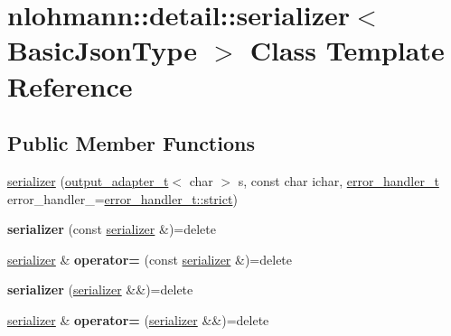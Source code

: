 \hypertarget{classnlohmann_1_1detail_1_1serializer}{}\section{nlohmann\+:\+:detail\+:\+:serializer$<$ Basic\+Json\+Type $>$ Class Template Reference}
\label{classnlohmann_1_1detail_1_1serializer}
\subsection*{Public Member Functions}
\begin{DoxyCompactItemize}
\item 
\hyperlink{classnlohmann_1_1detail_1_1serializer_ac010525281d97867ee842da37294fe83}{serializer} (\hyperlink{namespacenlohmann_1_1detail_a9b680ddfb58f27eb53a67229447fc556}{output\+\_\+adapter\+\_\+t}$<$ char $>$ s, const char ichar, \hyperlink{namespacenlohmann_1_1detail_a5a76b60b26dc8c47256a996d18d967df}{error\+\_\+handler\+\_\+t} error\+\_\+handler\+\_\+=\hyperlink{namespacenlohmann_1_1detail_a5a76b60b26dc8c47256a996d18d967dfa2133fd717402a7966ee88d06f9e0b792}{error\+\_\+handler\+\_\+t\+::strict})
\item 
\mbox{\label{classnlohmann_1_1detail_1_1serializer_ae3771351ec4cb892bec707edeb56dc31}} 
{\bfseries serializer} (const \hyperlink{classnlohmann_1_1detail_1_1serializer}{serializer} \&)=delete
\item 
\mbox{\label{classnlohmann_1_1detail_1_1serializer_a5f14c33012477b9f9876dc54d97009a0}} 
\hyperlink{classnlohmann_1_1detail_1_1serializer}{serializer} \& {\bfseries operator=} (const \hyperlink{classnlohmann_1_1detail_1_1serializer}{serializer} \&)=delete
\item 
\mbox{\label{classnlohmann_1_1detail_1_1serializer_a28081304e70cca6b3042c101ee5c498c}} 
{\bfseries serializer} (\hyperlink{classnlohmann_1_1detail_1_1serializer}{serializer} \&\&)=delete
\item 
\mbox{\label{classnlohmann_1_1detail_1_1serializer_acaafe3436ee5fb74777eb4132a88c513}} 
\hyperlink{classnlohmann_1_1detail_1_1serializer}{serializer} \& {\bfseries operator=} (\hyperlink{classnlohmann_1_1detail_1_1serializer}{serializer} \&\&)=delete

\end{DoxyCompactItemize}
